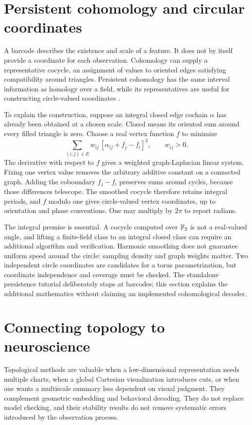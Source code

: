 \section{Persistent cohomology and circular coordinates}
A barcode describes the existence and scale of a feature. It does not by itself provide a coordinate for each observation. Cohomology can supply a representative cocycle, an assignment of values to oriented edges satisfying compatibility around triangles. Persistent cohomology has the same interval information as homology over a field, while its representatives are useful for constructing circle-valued coordinates \citep{desilva2011}.

To explain the construction, suppose an integral closed edge cochain $\alpha$ has already been obtained at a chosen scale. Closed means its oriented sum around every filled triangle is zero. Choose a real vertex function $f$ to minimize
\begin{equation}
 \sum_{(i,j)\in E}w_{ij}\,[\alpha_{ij}+f_j-f_i]^2,
 \qquad w_{ij}>0.\label{eq:09-circular-smoothing}
\end{equation}
The derivative with respect to $f$ gives a weighted graph-Laplacian linear system. Fixing one vertex value removes the arbitrary additive constant on a connected graph. Adding the coboundary $f_j-f_i$ preserves sums around cycles, because those differences telescope. The smoothed cocycle therefore retains integral periods, and $f$ modulo one gives circle-valued vertex coordinates, up to orientation and phase conventions. One may multiply by $2\pi$ to report radians.

The integral premise is essential. A cocycle computed over $\mathbb{F}_2$ is not a real-valued angle, and lifting a finite-field class to an integral closed class can require an additional algorithm and verification. Harmonic smoothing does not guarantee uniform speed around the circle: sampling density and graph weights matter. Two independent circle coordinates are candidates for a torus parametrization, but coordinate independence and coverage must be checked. The standalone persistence tutorial deliberately stops at barcodes; this section explains the additional mathematics without claiming an implemented cohomological decoder.

\section{Connecting topology to neuroscience}
Topological methods are valuable when a low-dimensional representation needs multiple charts, when a global Cartesian visualization introduces cuts, or when one wants a multiscale summary less dependent on visual judgment. They complement geometric embedding and behavioral decoding. They do not replace model checking, and their stability results do not remove systematic errors introduced by the observation process.

